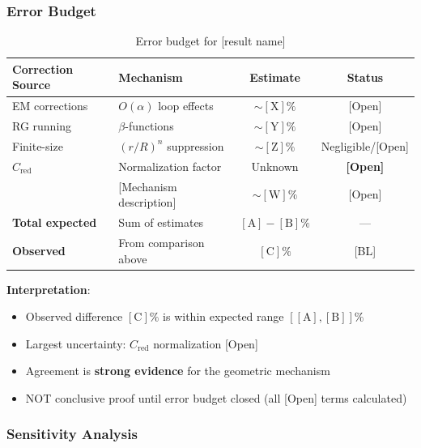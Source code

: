 
\subsubsection{Error Budget}

\begin{table}[h]
\centering
\begin{tabular}{llcc}
\hline
\textbf{Correction Source} & \textbf{Mechanism} & \textbf{Estimate} & \textbf{Status} \\
\hline
EM corrections & $O(\alpha)$ loop effects & $\sim [\text{X}]\%$ & [Open] \\
RG running & $\beta$-functions & $\sim [\text{Y}]\%$ & [Open] \\
Finite-size & $(r/R)^n$ suppression & $\sim [\text{Z}]\%$ & Negligible/[Open] \\
$C_{\mathrm{red}}$ & Normalization factor & Unknown & \textbf{[Open]} \\
[Other source] & [Mechanism description] & $\sim [\text{W}]\%$ & [Open] \\
\hline
\textbf{Total expected} & Sum of estimates & \textbf{$[\text{A}]{-}[\text{B}]\%$} & --- \\
\textbf{Observed} & From comparison above & \textbf{$[\text{C}]\%$} & [BL] \\
\hline
\end{tabular}
\caption{Error budget for [result name]}
\label{tab:error_budget_[result]}
\end{table}

\textbf{Interpretation}:
\begin{itemize}
\item Observed difference $[\text{C}]\%$ is within expected range $[[\text{A}], [\text{B}]]\%$
\item Largest uncertainty: $C_{\mathrm{red}}$ normalization [Open]
\item Agreement is \textbf{strong evidence} for the geometric mechanism
\item NOT conclusive proof until error budget closed (all [Open] terms calculated)
\end{itemize}


\subsubsection{Sensitivity Analysis}

